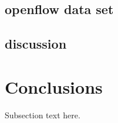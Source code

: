 \documentclass[journal]{IEEEtran}
\begin{document}
\subsection{openflow data set}
\subsection{discussion}

\section{Conclusions}
Subsection text here.






%


%
%
\end{document}
